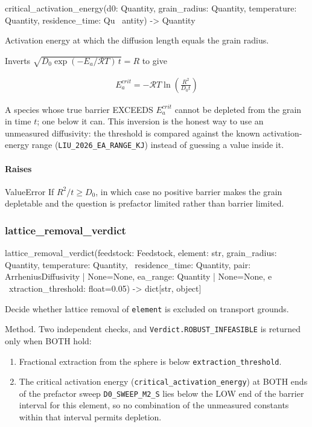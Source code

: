 \documentclass[10pt,a4paper,twoside]{report}
\begin{document}
\begin{verbatimsmall}
critical_activation_energy(d0: Quantity, grain_radius: Quantity, temperature: Quantity, residence_time: Qu
    \ antity) -> Quantity
\end{verbatimsmall}

Activation energy at which the diffusion length equals the grain radius.

Inverts $\sqrt{D_0 \exp(-E_a/\mathcal{R}T)\,t} = R$ to give

\begin{equation*}
\begin{gathered}
E_a^{crit} = -\mathcal{R} T \ln\!\left(\frac{R^2}{D_0 t}\right)
\end{gathered}
\end{equation*}

A species whose true barrier EXCEEDS $E_a^{crit}$ cannot be depleted from the grain in time $t$; one below it can. This inversion is the honest way to use an unmeasured diffusivity: the threshold is compared against the known activation-energy range (\texttt{LIU\_2026\_EA\_RANGE\_KJ}) instead of guessing a value inside it.

\paragraph*{Raises}

ValueError If $R^2/t \geq D_0$, in which case no positive barrier makes the grain depletable and the question is prefactor limited rather than barrier limited.

\subsubsection*{lattice\_removal\_verdict}

\begin{verbatimsmall}
lattice_removal_verdict(feedstock: Feedstock, element: str, grain_radius: Quantity, temperature: Quantity,
    \  residence_time: Quantity, pair: ArrheniusDiffusivity | None=None, ea_range: Quantity | None=None, e
    \ xtraction_threshold: float=0.05) -> dict[str, object]
\end{verbatimsmall}

Decide whether lattice removal of \texttt{element} is excluded on transport grounds.

Method. Two independent checks, and \texttt{Verdict.ROBUST\_INFEASIBLE} is returned only when BOTH hold:

\begin{enumerate}[leftmargin=*,label=\arabic*.]
\item Fractional extraction from the sphere is below \texttt{extraction\_threshold}.
\item The critical activation energy (\texttt{critical\_activation\_energy}) at BOTH ends of the prefactor sweep \texttt{D0\_SWEEP\_M2\_S} lies below the LOW end of the barrier interval for this element, so no combination of the unmeasured constants within that interval permits depletion.
\end{enumerate}
\end{document}
